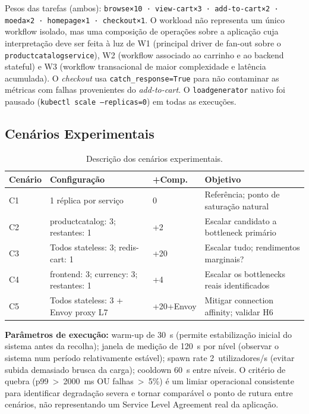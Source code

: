 \documentclass[manuscript,oneside]{acmart}
\begin{document}
Pesos das tarefas (ambos): \texttt{browse×10 · view-cart×3 · add-to-cart×2 · moeda×2 · homepage×1 · checkout×1}. O workload não representa um único workflow isolado, mas uma composição de operações sobre a aplicação cuja interpretação deve ser feita à luz de W1 (principal driver de fan-out sobre o \texttt{productcatalogservice}), W2 (workflow associado ao carrinho e ao backend stateful) e W3 (workflow transacional de maior complexidade e latência acumulada). O \textit{checkout} usa \texttt{catch\_response=True} para não contaminar as métricas com falhas provenientes do \textit{add-to-cart}. O \texttt{loadgenerator} nativo foi pausado (\texttt{kubectl scale --replicas=0}) em todas as execuções.

\subsection{Cenários Experimentais}

\begin{table}[H]
\caption{Descrição dos cenários experimentais.}
\label{tab:cenarios}
\begin{tabularx}{\columnwidth}{lXlX}
\toprule
\textbf{Cenário} & \textbf{Configuração} & \textbf{+Comp.} & \textbf{Objetivo} \\
\midrule
C1 & 1 réplica por serviço & 0 & Referência; ponto de saturação natural \\
C2 & productcatalog: 3; restantes: 1 & +2 & Escalar candidato a bottleneck primário \\
C3 & Todos stateless: 3; redis-cart: 1 & +20 & Escalar tudo; rendimentos marginais? \\
C4 & frontend: 3; currency: 3; restantes: 1 & +4 & Escalar os bottlenecks reais identificados \\
C5 & Todos stateless: 3 + Envoy proxy L7 & +20+Envoy & Mitigar connection affinity; validar H6 \\
\bottomrule
\end{tabularx}
\end{table}

\textbf{Parâmetros de execução:} warm-up de 30~s (permite estabilização inicial do sistema antes da recolha); janela de medição de 120~s por nível (observar o sistema num período relativamente estável); spawn rate 2~utilizadores/s (evitar subida demasiado brusca da carga); cooldown 60~s entre níveis. O critério de quebra (p99~>~2000~ms OU falhas~>~5\%) é um limiar operacional consistente para identificar degradação severa e tornar comparável o ponto de rutura entre cenários, não representando um Service Level Agreement real da aplicação.
\end{document}
